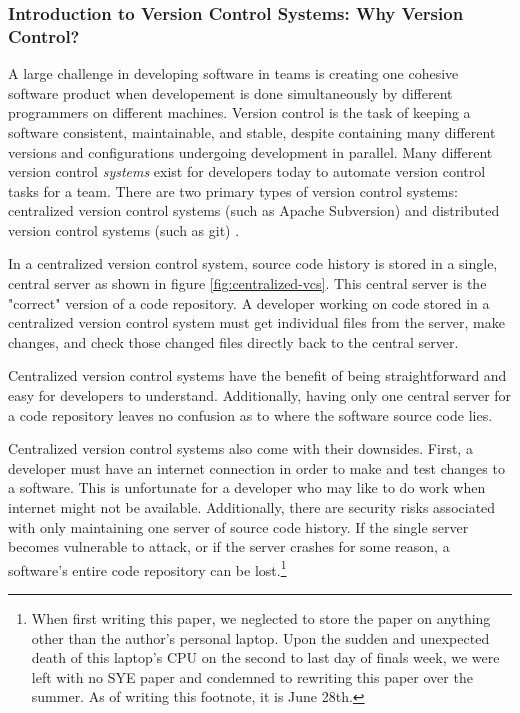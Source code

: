 \documentclass{article}
\begin{document}
\subsubsection{Introduction to Version Control Systems: Why Version Control?}

A large challenge in developing software in teams is creating one cohesive software product when developement is done simultaneously by different programmers on different machines. Version control is the task of keeping a software consistent, maintainable, and stable, despite containing many different versions and configurations undergoing development in parallel. Many different version control \emph{systems} exist for developers today to automate version control tasks for a team. There are two primary types of version control systems: centralized version control systems (such as Apache Subversion) and distributed version control systems (such as git) \cite{Collins-SussmanFitzpatrickPilato_2004, ChaconStraub_2014}.

In a centralized version control system, source code history is stored in a single, central server as shown in figure \ref{fig:centralized-vcs}. This central server is the "correct" version of a code repository. A developer working on code stored in a centralized version control system must get individual files from the server, make changes, and check those changed files directly back to the central server.

Centralized version control systems have the benefit of being straightforward and easy for developers to understand. Additionally, having only one central server for a code repository leaves no confusion as to where the software source code lies. 

Centralized version control systems also come with their downsides. First, a developer must have an internet connection in order to make and test changes to a software. This is unfortunate for a developer who may like to do work when internet might not be available. Additionally, there are security risks associated with only maintaining one server of source code history. If the single server becomes vulnerable to attack, or if the server crashes for some reason, a software's entire code repository can be lost.\footnote{When first writing this paper, we neglected to store the paper on anything other than the author's personal laptop. Upon the sudden and unexpected death of this laptop's CPU on the second to last day of finals week, we were left with no SYE paper and condemned to rewriting this paper over the summer. As of writing this footnote, it is June 28th.}
\end{document}
